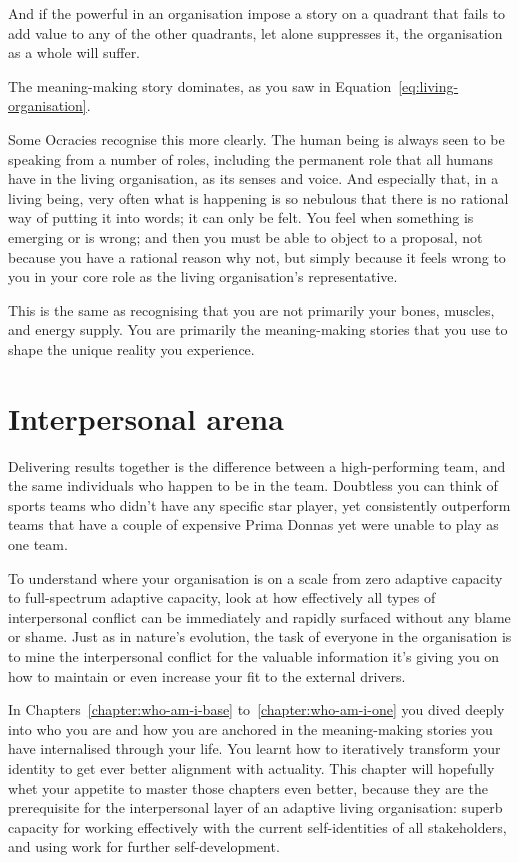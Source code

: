 And if the powerful in an organisation impose a story on a quadrant that fails to add value to any of the other quadrants, let alone suppresses it, the organisation as a whole will suffer. 


The meaning\hyp{}making story dominates, as you saw in Equation~\ref{eq:living-organisation}.


Some Ocracies  recognise this more clearly. The human being is always seen to be speaking from a number of roles, including the permanent role that all humans have in the living organisation, as its senses and voice. And especially that, in a living being, very often what is happening is so nebulous that there is no rational way of putting it into words; it can only be felt. You feel when something is emerging or is wrong; and then you must be able to object to a proposal, not because you have a rational reason why not, but simply because it feels wrong to you in your core role as the living organisation’s representative. 


This is the same as recognising that you are not primarily your bones, muscles, and energy supply. You are primarily the meaning\hyp{}making stories  that you use to shape the unique reality you experience.
\section{Interpersonal arena}
\label{section:interpersonal}
Delivering results together is the difference between a high-performing team, and the same individuals who happen to be in the team. Doubtless you can think of sports teams who didn't have any specific star player, yet consistently outperform teams that have a couple of expensive Prima Donnas yet were unable to play as one team.


To understand where your organisation is on a scale from zero adaptive capacity to full-spectrum adaptive capacity, look at how effectively all types of interpersonal conflict can be immediately and rapidly surfaced without any blame or shame. Just as in nature's evolution, the task of everyone in the organisation is to mine the interpersonal conflict for the valuable information it's giving you on how to maintain or even increase your fit to the external drivers.


In Chapters~\ref{chapter:who-am-i-base} to~\ref{chapter:who-am-i-one} you dived deeply into who you are and how you are anchored in the meaning\hyp{}making stories you have internalised through your life. You learnt how to iteratively transform your identity to get ever better alignment with actuality. This chapter will hopefully whet your appetite to master those chapters even better, because they are the prerequisite for the interpersonal layer of an adaptive living organisation: superb capacity for working effectively with the current self-identities of all stakeholders, and using work for further self-development.


